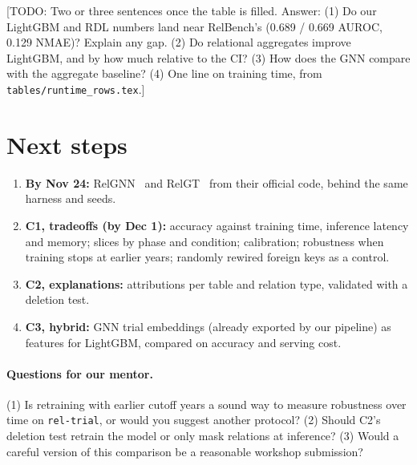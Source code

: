 \documentclass{article}
\newcommand{\todo}[1]{\textcolor{red!70!black}{[TODO: #1]}}
\begin{document}
\todo{Two or three sentences once the table is filled. Answer: (1) Do our LightGBM and RDL
numbers land near RelBench's (0.689 / 0.669 AUROC, 0.129 NMAE)? Explain any gap. (2) Do
relational aggregates improve LightGBM, and by how much relative to the CI? (3) How does the
GNN compare with the aggregate baseline? (4) One line on training time, from
\texttt{tables/runtime\_rows.tex}.}

\section{Next steps}

\begin{enumerate}
\item \textbf{By Nov 24:} RelGNN~\cite{chen2025relgnn} and RelGT~\cite{dwivedi2026relgt} from
their official code, behind the same harness and seeds.
\item \textbf{C1, tradeoffs (by Dec 1):} accuracy against training time, inference latency and
memory; slices by phase and condition; calibration; robustness when training stops at earlier
years; randomly rewired foreign keys as a control.
\item \textbf{C2, explanations:} attributions per table and relation type, validated with a
deletion test.
\item \textbf{C3, hybrid:} GNN trial embeddings (already exported by our pipeline) as features
for LightGBM, compared on accuracy and serving cost.
\end{enumerate}

\paragraph{Questions for our mentor.} (1) Is retraining with earlier cutoff years a sound way
to measure robustness over time on \texttt{rel-trial}, or would you suggest another protocol?
(2) Should C2's deletion test retrain the model or only mask relations at inference?
(3) Would a careful version of this comparison be a reasonable workshop submission?
\end{document}
